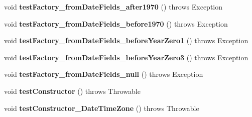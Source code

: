 \begin{DoxyCompactItemize}
\item 
\hypertarget{classorg_1_1joda_1_1time_1_1_test_local_date___constructors_a971daaa80a98b9af28b9867640dce1c0}{void {\bfseries test\-Factory\-\_\-from\-Date\-Fields\-\_\-after1970} ()  throws Exception }\label{classorg_1_1joda_1_1time_1_1_test_local_date___constructors_a971daaa80a98b9af28b9867640dce1c0}

\item 
\hypertarget{classorg_1_1joda_1_1time_1_1_test_local_date___constructors_a9750550d1e7b5aabf9a236403875def6}{void {\bfseries test\-Factory\-\_\-from\-Date\-Fields\-\_\-before1970} ()  throws Exception }\label{classorg_1_1joda_1_1time_1_1_test_local_date___constructors_a9750550d1e7b5aabf9a236403875def6}

\item 
\hypertarget{classorg_1_1joda_1_1time_1_1_test_local_date___constructors_a416e964ecfda3ea8c4cbb1ae53ed300f}{void {\bfseries test\-Factory\-\_\-from\-Date\-Fields\-\_\-before\-Year\-Zero1} ()  throws Exception }\label{classorg_1_1joda_1_1time_1_1_test_local_date___constructors_a416e964ecfda3ea8c4cbb1ae53ed300f}

\item 
\hypertarget{classorg_1_1joda_1_1time_1_1_test_local_date___constructors_a7365076638e60c7e0fd72fa47c90ec13}{void {\bfseries test\-Factory\-\_\-from\-Date\-Fields\-\_\-before\-Year\-Zero3} ()  throws Exception }\label{classorg_1_1joda_1_1time_1_1_test_local_date___constructors_a7365076638e60c7e0fd72fa47c90ec13}

\item 
\hypertarget{classorg_1_1joda_1_1time_1_1_test_local_date___constructors_aa973e13aeed8a6139fa309692a048270}{void {\bfseries test\-Factory\-\_\-from\-Date\-Fields\-\_\-null} ()  throws Exception }\label{classorg_1_1joda_1_1time_1_1_test_local_date___constructors_aa973e13aeed8a6139fa309692a048270}

\item 
\hypertarget{classorg_1_1joda_1_1time_1_1_test_local_date___constructors_a61658b28fd69b9ef9cee3fe94ea5605a}{void {\bfseries test\-Constructor} ()  throws Throwable }\label{classorg_1_1joda_1_1time_1_1_test_local_date___constructors_a61658b28fd69b9ef9cee3fe94ea5605a}

\item 
\hypertarget{classorg_1_1joda_1_1time_1_1_test_local_date___constructors_a7e314598a1c5e25a8243e2075490923f}{void {\bfseries test\-Constructor\-\_\-\-Date\-Time\-Zone} ()  throws Throwable }\label{classorg_1_1joda_1_1time_1_1_test_local_date___constructors_a7e314598a1c5e25a8243e2075490923f}


\end{DoxyCompactItemize}
